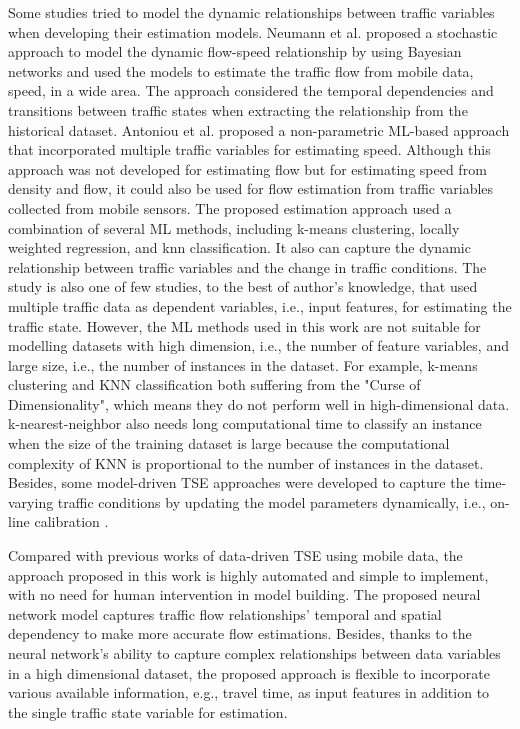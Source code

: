 \documentclass[english]{kththesis}
\begin{document}
Some studies tried to model the dynamic relationships between traffic variables when developing their estimation models. Neumann et al. \cite{neumann_bayesian} proposed a stochastic approach to model the dynamic flow-speed relationship by using Bayesian networks and used the models to estimate the traffic flow from mobile data, speed, in a wide area. The approach considered the temporal dependencies and transitions between traffic states when extracting the relationship from the historical dataset. Antoniou et al. \cite{antoniou_ml_estimation} proposed a non-parametric ML-based approach that incorporated multiple traffic variables for estimating speed. Although this approach was not developed for estimating flow but for estimating speed from density and flow, it could also be used for flow estimation from traffic variables collected from mobile sensors. The proposed estimation approach used a combination of several ML methods, including k-means clustering, locally weighted regression, and \gls{knn} classification. It also can capture the dynamic relationship between traffic variables and the change in traffic conditions. The study is also one of few studies, to the best of author's knowledge, that used multiple traffic data as dependent variables, i.e., input features, for estimating the traffic state. However, the ML methods used in this work are not suitable for modelling datasets with high dimension, i.e., the number of feature variables, and large size, i.e., the number of instances in the dataset. For example, k-means clustering and KNN classification both suffering from the "Curse of Dimensionality", which means they do not perform well in high-dimensional data. k-nearest-neighbor also needs long computational time to classify an instance when the size of the training dataset is large because the computational complexity of KNN is proportional to the number of instances in the dataset. Besides, some model-driven TSE approaches were developed to capture the time-varying traffic conditions by updating the model parameters dynamically, i.e., on-line calibration \cite{nguyen_online_calibration_fd_model, wang_tse_online_calibration}.

Compared with previous works of data-driven TSE using mobile data, the approach proposed in this work is highly automated and simple to implement, with no need for human intervention in model building. The proposed neural network model captures traffic flow relationships' temporal and spatial dependency to make more accurate flow estimations. Besides, thanks to the neural network's ability to capture complex relationships between data variables in a high dimensional dataset, the proposed approach is flexible to incorporate various available information, e.g., travel time, as input features in addition to the single traffic state variable for estimation.
\end{document}
